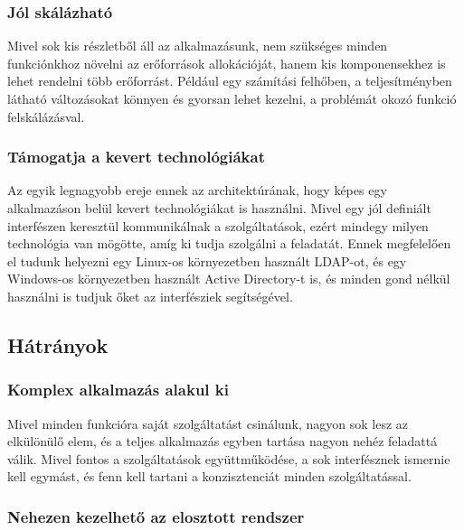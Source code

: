 \documentclass[11pt,magyar,a4paper,twoside,]{report}
\begin{document}
\subsubsection{Jól skálázható}\label{juxf3l-skuxe1luxe1zhatuxf3}

Mivel sok kis részletből áll az alkalmazásunk, nem szükséges minden
funkciónkhoz növelni az erőforrások allokációját, hanem kis
komponensekhez is lehet rendelni több erőforrást. Például egy számítási
felhőben, a teljesítményben látható változásokat könnyen és gyorsan
lehet kezelni, a problémát okozó funkció felskálázásval.

\subsubsection{Támogatja a kevert
technológiákat}\label{tuxe1mogatja-a-kevert-technoluxf3giuxe1kat}

Az egyik legnagyobb ereje ennek az architektúrának, hogy képes egy
alkalmazáson belül kevert technológiákat is használni. Mivel egy jól
definiált interfészen keresztül kommunikálnak a szolgáltatások, ezért
mindegy milyen technológia van mögötte, amíg ki tudja szolgálni a
feladatát. Ennek megfelelően el tudunk helyezni egy Linux-os
környezetben használt LDAP-ot, és egy Windows-os környezetben használt
Active Directory-t is, és minden gond nélkül használni is tudjuk őket az
interfésziek segítségével.

\subsection{Hátrányok}\label{huxe1truxe1nyok}

\subsubsection{Komplex alkalmazás alakul
ki}\label{komplex-alkalmazuxe1s-alakul-ki}

Mivel minden funkcióra saját szolgáltatást csinálunk, nagyon sok lesz az
elkülönülő elem, és a teljes alkalmazás egyben tartása nagyon nehéz
feladattá válik. Mivel fontos a szolgáltatások együttműködése, a sok
interfésznek ismernie kell egymást, és fenn kell tartani a
konzisztenciát minden szolgáltatással.

\subsubsection{Nehezen kezelhető az elosztott
rendszer}\label{nehezen-kezelhetux151-az-elosztott-rendszer}
\end{document}
